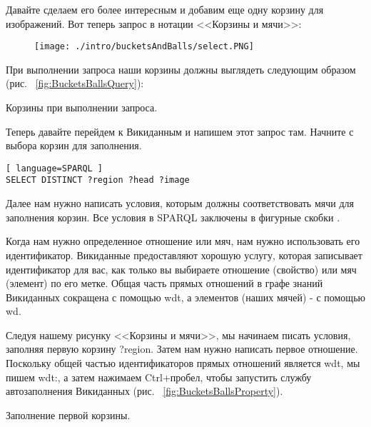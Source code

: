 \newpage
Давайте сделаем его более интересным и добавим еще одну корзину для изображений. Вот теперь запрос в нотации <<Корзины и мячи>>:

\begin{figure*}[h!]
\texttt{[image: ./intro/bucketsAndBalls/select.PNG]}
\end{figure*}

При выполнении запроса наши корзины должны выглядеть следующим образом (рис. ~\ref{fig:BucketsBallsQuery}): 

\begin{marginfigure}[1.0cm]
	{
		\setlength{\fboxsep}{0pt}%
		\setlength{\fboxrule}{1pt}%
	}
    \caption{Корзины при выполнении запроса.}
	\label{fig:BucketsBallsQuery}
\end{marginfigure}

Теперь давайте перейдем к Викиданным и напишем этот запрос там. Начните с выбора корзин для заполнения.

\begin{lstlisting}[ language=SPARQL ]
SELECT DISTINCT ?region ?head ?image
\end{lstlisting}

Далее нам нужно написать условия, которым должны соответствовать мячи для заполнения корзин. Все условия в SPARQL заключены в фигурные скобки {}.

Когда нам нужно определенное отношение или мяч, нам нужно использовать его идентификатор. Викиданные предоставляют хорошую услугу, которая записывает идентификатор для вас, как только вы выбираете отношение (свойство) или мяч (элемент) по его метке. Общая часть прямых отношений в графе знаний Викиданных сокращена с помощью wdt, а элементов (наших мячей) - с помощью wd.

Следуя нашему рисунку <<Корзины и мячи>>, мы начинаем писать условия, заполняя первую корзину ?region. Затем нам нужно написать первое отношение. Поскольку общей частью идентификаторов прямых отношений является wdt, мы пишем wdt:, а затем нажимаем Ctrl+пробел, чтобы запустить службу автозаполнения Викиданных (рис. ~\ref{fig:BucketsBallsProperty}).

\begin{marginfigure}[-2.5cm]
	{
		\setlength{\fboxsep}{0pt}%
		\setlength{\fboxrule}{1pt}%
	}
    \caption{Заполнение первой корзины.}
	\label{fig:BucketsBallsProperty}
\end{marginfigure}

